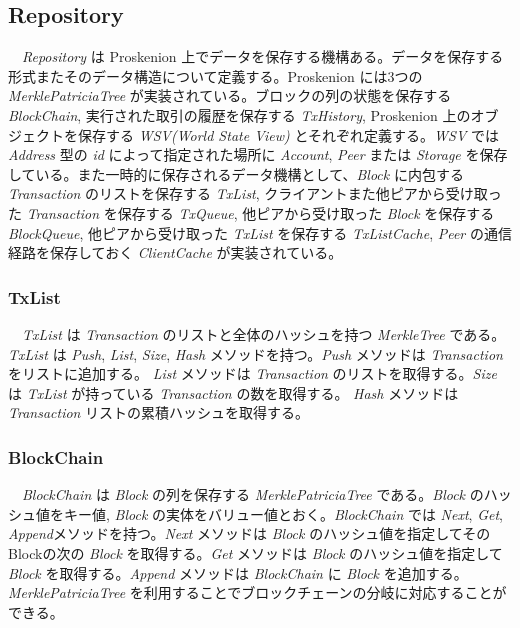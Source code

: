 \hypertarget{repository}{%
\subsection{Repository}\label{repository}}

　\emph{Repository} は Proskenion
上でデータを保存する機構ある。データを保存する形式またそのデータ構造について定義する。Proskenion
には3つの \emph{MerklePatriciaTree}
が実装されている。ブロックの列の状態を保存する \emph{BlockChain},
実行された取引の履歴を保存する \emph{TxHistory}, Proskenion
上のオブジェクトを保存する \emph{WSV(World State View)}
とそれぞれ定義する。\emph{WSV} では \emph{Address} 型の \emph{id}
によって指定された場所に \emph{Account}, \emph{Peer} または
\emph{Storage}
を保存している。また一時的に保存されるデータ機構として、\emph{Block}
に内包する \emph{Transaction} のリストを保存する \emph{TxList},
クライアントまた他ピアから受け取った \emph{Transaction} を保存する
\emph{TxQueue}, 他ピアから受け取った \emph{Block} を保存する
\emph{BlockQueue}, 他ピアから受け取った \emph{TxList} を保存する
\emph{TxListCache}, \emph{Peer} の通信経路を保存しておく
\emph{ClientCache} が実装されている。

\hypertarget{txlist}{%
\subsubsection{TxList}\label{txlist}}

　\emph{TxList} は \emph{Transaction} のリストと全体のハッシュを持つ
\emph{MerkleTree} である。\emph{TxList} は \emph{Push}, \emph{List},
\emph{Size}, \emph{Hash} メソッドを持つ。\emph{Push} メソッドは
\emph{Transaction} をリストに追加する。 \emph{List} メソッドは
\emph{Transaction} のリストを取得する。\emph{Size} は \emph{TxList}
が持っている \emph{Transaction} の数を取得する。 \emph{Hash} メソッドは
\emph{Transaction} リストの累積ハッシュを取得する。

\hypertarget{blockchain}{%
\subsubsection{BlockChain}\label{blockchain}}

　\emph{BlockChain} は \emph{Block} の列を保存する
\emph{MerklePatriciaTree} である。\emph{Block} のハッシュ値をキー値,
\emph{Block} の実体をバリュー値とおく。\emph{BlockChain} では
\emph{Next}, \emph{Get}, \emph{Append}メソッドを持つ。\emph{Next}
メソッドは \emph{Block} のハッシュ値を指定してそのBlockの次の
\emph{Block} を取得する。\emph{Get} メソッドは \emph{Block}
のハッシュ値を指定して \emph{Block} を取得する。\emph{Append} メソッドは
\emph{BlockChain} に \emph{Block} を追加する。\emph{MerklePatriciaTree}
を利用することでブロックチェーンの分岐に対応することができる。

